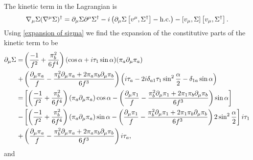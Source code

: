 The kinetic term in the \chpt Lagrangian is
\begin{equation}
    \nabla_\mu \Sigma (\nabla^\mu \Sigma)^\dagger 
    = \partial_\mu \Sigma \partial^\mu \Sigma^\dagger 
    - i \left(\partial_\mu \Sigma \left[v^\mu, \Sigma^\dagger \right] - \mathrm{h.c.} \right)
    - \left[v_\mu, \Sigma \right]\left[v_\mu, \Sigma^\dagger \right].
    \label{kinetic term}
\end{equation}
Using \autoref{expansion of sigma} we find the expansion of the constitutive parts of the kinetic term to be
\begin{align}
    \notag
    \partial_\mu \Sigma = &
    \left(
        \frac{-1}{f^2}
        + \frac{\pi_b^2}{6f^4}
    \right)
    (\cos{\alpha} + i \tau_1 \sin{\alpha}) (\pi_a \partial_\mu \pi_a)\\\notag
    +&
    \left(
        \frac{\partial_\mu \pi_a}{f} 
        - \frac{\pi_b^2 \partial_\mu\pi_a 
        + 2 \pi_a \pi_b \partial_\mu\pi_b}{6f^3} 
    \right)
    \left(
        i\tau_a - 2i \delta_{a1}\tau_1\sin^2{\frac{\alpha}{2}} - \delta_{1a} \sin{\alpha}
    \right)
    \\ \notag
    =& 
    \left[
        \left(
            \frac{-1}{f^2}
            + \frac{\pi_b^2}{6f^4}
        \right)
        (\pi_a \partial_\mu \pi_a)
        \cos{\alpha}
        - 
        \left(
            \frac{\partial_\mu \pi_1}{f} 
            - \frac{\pi_b^2 \partial_\mu\pi_1
            + 2 \pi_1 \pi_b \partial_\mu\pi_b}{6f^3} 
        \right)
        \sin{\alpha}
    \right]
    \\ \notag 
    - &
    \left[
        \left(
            \frac{-1}{f^2}
            + \frac{\pi_b^2}{6f^4}
        \right)
        (\pi_a \partial_\mu \pi_a)
        \sin{\alpha}
        - \left(
        \frac{\partial_\mu \pi_1}{f} 
        - \frac{\pi_b^2 \partial_\mu\pi_1
        + 2 \pi_1 \pi_b \partial_\mu\pi_b}{6f^3}
        \right)
        2 \sin^2{\frac{\alpha}{2}}
    \right]
    i \tau_1 \\ \label{Sigma derivative}
    +& 
    \left(
        \frac{\partial_\mu \pi_a}{f} 
        - \frac{\pi_b^2 \partial_\mu\pi_a 
        + 2 \pi_a \pi_b \partial_\mu\pi_b}{6f^3} 
    \right)
    i \tau_a,
\end{align}
and
